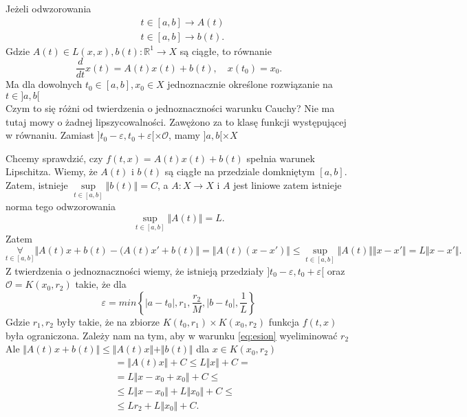 \documentclass[../main.tex]{subfiles}
\begin{document}
\begin{tw}
    Jeżeli odwzorowania
        \begin{align*}
            &t\in [a,b]\to A(t)\\
            &t\in [a,b]\to b(t)
        .\end{align*}
        Gdzie $A(t)\in L(x,x), b(t) : \mathbb{R}^1\to X$ są ciągłe, to równanie
        \[
            \frac{d}{dt}x(t) = A(t)x(t) + b(t),\quad x(t_0) = x_0
        .\]
        Ma dla dowolnych $t_0\in[a,b], x_0\in X$ jednoznacznie określone rozwiązanie na $t\in]a,b[$\\
        Czym to się różni od twierdzenia o jednoznaczności warunku Cauchy? Nie ma tutaj mowy o żadnej lipszycowalności. Zawężono za to klasę funkcji występującej w równaniu. Zamiast $]t_0-\varepsilon,t_0+\varepsilon[\times \mathcal{O}$, mamy $]a,b[ \times X$
\end{tw}
\begin{dowod}
    Chcemy sprawdzić, czy $f(t,x) = A(t) x(t)+b(t)$ spełnia warunek Lipschitza. Wiemy, że  $A(t)$ i $b(t)$ są ciągłe na przedziale domkniętym $[a,b]$.
    Zatem, istnieje $\underset{t\in[a,b]}{\sup} \Vert b(t) \Vert = C$, a $A: X\to X$ i $A$ jest liniowe zatem istnieje norma tego odwzorowania
    \[
        \underset{t\in[a,b]}{\sup} \Vert A(t) \Vert = L
    .\]
    Zatem
    \[
        \underset{t\in[a,b]}{\forall} \Vert A(t)x + b(t) - (A(t) x' + b(t) \Vert = \Vert A(t)(x-x') \Vert \le \underset{t\in[a,b]}{\sup} \Vert A(t) \Vert \Vert x-x' \Vert = L \Vert x-x' \Vert
    .\]
    Z twierdzenia o jednoznaczności wiemy, że istnieją przedziały
    $]t_0-\varepsilon,t_0+\varepsilon[$ oraz $\mathcal{O} = K(x_0,r_2)$ takie, że dla
    \begin{equation}\label{eq:esion}
        \varepsilon = min\left\{|a-t_0|,r_1,\frac{r_2}{M},|b-t_0|,\frac{1}{L} \right\}
    \end{equation}
    Gdzie $r_1,r_2$ były takie, że na zbiorze $K(t_0,r_1)\times K(x_0,r_2)$ funkcja $f(t,x)$ była ograniczona.
    Zależy nam na tym, aby w warunku \ref{eq:esion} wyeliminować $r_2$\\
    Ale $\Vert A(t)x + b(t) \Vert \le \Vert A(t)x\Vert + \Vert b(t) \Vert$ dla $x\in K(x_0,r_2)$
    \begin{align*}
        &= \Vert A(t)x \Vert + C \le L\Vert x \Vert + C = \\
        &= L\Vert x-x_0+x_0 \Vert +C \le\\
        &\le L \Vert x-x_0 \Vert + L \Vert x_0 \Vert  + C\le\\
        &\le L r_2 + L \Vert x_0 \Vert +C
    .\end{align*}




\end{dowod}
\end{document}
